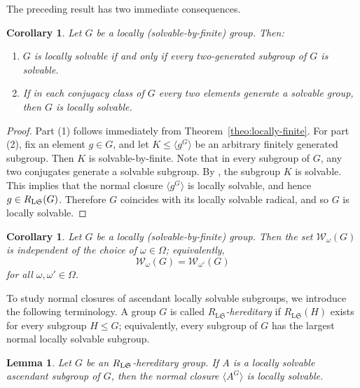 \documentclass[11pt, reqno]{amsart}
\numberwithin{equation}{section}
\newtheorem{lemma}[theorem]{Lemma}
\newtheorem{corollary}[theorem]{Corollary}
\theoremstyle{definition}
\numberwithin{equation}{section}
\begin{document}
The preceding result has two immediate consequences. 

\begin{corollary}\label{cor:locally_finite_2gen}
Let $G$ be a locally \textup{(\emph{solvable-by-finite})} group. Then:
\begin{enumerate}[label = \textup{(\arabic*)}]
    \item $G$ is locally solvable if and only if every two-generated subgroup of $G$ is solvable.
    \item If in each conjugacy class of $G$ every two elements generate a solvable group, then $G$ is locally solvable.
\end{enumerate}    
\end{corollary}

\begin{proof}
Part (1) follows immediately from Theorem~\ref{theo:locally-finite}. For part \textup{(2)},   fix an element $g \in G$, and let $K \le \langle g^G \rangle$ be an arbitrary finitely generated subgroup. Then $K$ is solvable-by-finite. Note that in every subgroup of $G$, any two conjugates generate a solvable subgroup.  By \cite[Corollary~2.10]{CNH2025}, the subgroup $K$ is solvable. This implies that the normal closure $\langle g^G \rangle$ is locally solvable, and hence $g \in R_{\textup{L}\mathfrak{S}}(G)$. Therefore $G$ coincides with its locally solvable radical, and so $G$ is locally solvable.
\end{proof}

\begin{corollary}\label{cor:Wilsonradseteqradset}
Let $G$ be a locally \textup{(\emph{solvable-by-finite})} group. Then the set $\mathcal{W}_{\omega}(G)$ is independent of the choice of
$\omega\in\Omega$; equivalently,
  $$\mathcal{W}_{\omega}(G) = \mathcal{W}_{\omega'}(G)$$
for all $\omega,\omega'\in\Omega$.
\end{corollary} 

To study normal closures of ascendant locally solvable subgroups, we introduce the following terminology. A group $G$ is called \emph{$R_{\mathrm{L}\mathfrak S}$-hereditary} if $R_{\mathrm{L}\mathfrak S}(H)$ exists for every subgroup $H\leq G$; equivalently, every subgroup of $G$ has the largest normal locally solvable
subgroup.

\begin{lemma}\label{lem:ascenlocsolsubgroupislocsol}
Let $G$ be an $R_{\textup{L}\mathfrak{S}}$-hereditary group. If $A$ is a locally solvable ascendant subgroup of $G$, then the normal closure $\langle A^G \rangle$ is locally solvable.
\end{lemma}
\end{document}
